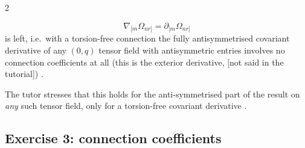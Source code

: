 \begin{paracol}{2}
\begin{enumerate}
        \[
          \nabla_{[m}\Omega_{nr]}=\partial_{[m}\Omega_{nr]}
        \]
        is left, i.e.\ with a torsion-free connection the fully antisymmetrised covariant derivative of any $(0,q)$ tensor field with antisymmetric entries involves no connection coefficients at all (this is the exterior derivative, [not said in the tutorial]) .
\end{enumerate}
The tutor stresses that this holds for the anti-symmetrised part of the result on \emph{any} such tensor field, only for a torsion-free covariant derivative .

\subsection*{Exercise 3: connection coefficients}


\end{paracol}
